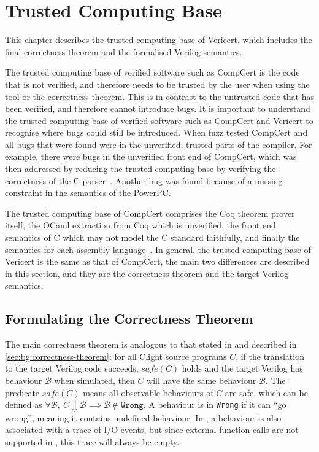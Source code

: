 \chapter{Trusted Computing Base}%
\label{sec:trusted-computing-base}

\begin{chapsummary}
  This chapter describes the trusted computing base of Vericert, which includes
  the final correctness theorem and the formalised Verilog semantics.
\end{chapsummary}

\noindent The trusted computing base of verified software such as CompCert is
the code that is not verified, and therefore needs to be trusted by the user
when using the tool or the correctness theorem.  This is in contrast to the
untrusted code that has been verified, and therefore cannot introduce bugs.  It
is important to understand the trusted computing base of verified software such
as CompCert and Vericert to recognise where bugs could still be introduced.
When \textcite{yang11_findin_under_bugs_c_compil} fuzz tested CompCert and all
bugs that were found were in the unverified, trusted parts of the compiler.  For
example, there were bugs in the unverified front end of CompCert, which was then
addressed by reducing the trusted computing base by verifying the correctness of
the C parser~\cite{jourdan12_valid_lr_parser}.  Another bug was found because of
a missing constraint in the semantics of the PowerPC.

The trusted computing base of CompCert comprises the Coq theorem prover itself,
the OCaml extraction from Coq which is unverified, the front end semantics of C
which may not model the C standard faithfully, and finally the semantics for
each assembly language~\cite{monniaux22_tcbcvc}.  In general, the trusted
computing base of Vericert is the same as that of CompCert, the main two
differences are described in this section, and they are the correctness theorem
and the target Verilog semantics.

\section{Formulating the Correctness Theorem}

The main correctness theorem is analogous to that stated in \compcert{} and
described in \cref{sec:bg:correctness-theorem}: for all Clight source programs
$C$, if the translation to the target Verilog code succeeds, $\mathit{safe}(C)$
holds and the target Verilog has behaviour $\mathcal{B}$ when simulated, then
$C$ will have the same behaviour $\mathcal{B}$.  The predicate
$\mathit{safe}(C)$ means all observable behaviours of $C$ are safe, which can be
defined as
$\forall \mathcal{B},\ C \Downarrow \mathcal{B} \implies \mathcal{B} \not\in
\texttt{Wrong}$.  A behaviour is in \texttt{Wrong} if it can \enquote{go wrong},
meaning it contains undefined behaviour.  In \compcert{}, a behaviour is also
associated with a trace of I/O events, but since external function calls are not
supported in \vericert{}, this trace will always be empty.

